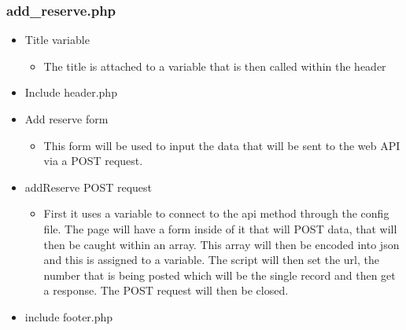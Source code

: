     \subsubsection{add\_reserve.php}
        \begin{itemize}
            \item Title variable
            \begin{itemize}
                \item The title is attached to a variable that is then called within the header
            \end{itemize}
            \item Include header.php
            \item Add reserve form
            \begin{itemize}
                \item This form will be used to input the data that will be sent to the web API via a POST request.
            \end{itemize}
            \item addReserve POST request 
            \begin{itemize}
                \item First it uses a variable to connect to the api method through the config file. The page will have a form inside of it that will POST data, that will then be caught within an array. This array will then be encoded into json and this is assigned to a variable. The script will then set the url, the number that is being posted which will be the single record and then get a response. The POST request will then be closed.
            \end{itemize}
            \item include footer.php
        \end{itemize}

